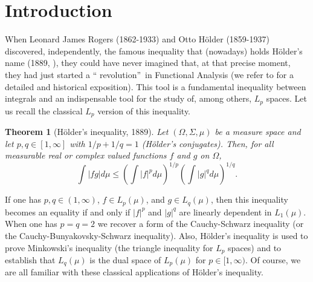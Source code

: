 \documentclass[10pt]{amsart}
\newtheorem{theorem}{Theorem}[section]
\numberwithin{equation}{section}
\begin{document}
\maketitle
\tableofcontents

\section{Introduction}

When Leonard James Rogers (1862-1933) and Otto H{\"{o}}lder (1859-1937)
discovered, independently, the famous inequality that (nowadays) holds H{\"{o}}lder's name (1889, \cite{holder1889}), they could have never imagined
that, at that precise moment, they had just started a \textquotedblleft
revolution\textquotedblright\ in Functional Analysis (we refer to \cite{Maligranda} for a detailed and historical exposition). This tool is a
fundamental inequality between integrals and an indispensable tool for the
study of, among others, $L_{p}$ spaces. Let us recall the classical $L_{p}$
version of this inequality.

\begin{theorem}[H{\"o}lder's inequality, 1889]
Let $(\Omega, \Sigma, \mu)$ be a measure space and let $p, q \in [1, \infty]$
with $1/p + 1/q = 1$ (H{\"o}lder's conjugates). Then, for all measurable
real or complex valued functions $f$ and $g$ on $\Omega$,
\begin{equation*}
\int |f g| d \mu \le \left( \int |f|^p d \mu \right)^{1/p} \left( \int |g|^q
d \mu \right)^{1/q}.
\end{equation*}
\end{theorem}

If one has $p,q\in (1,\infty )$, $f\in L_{p}(\mu )$, and $g\in L_{q}(\mu )$,
then this inequality becomes an equality if and only if $|f|^{p}$ and $|g|^{q}$ are linearly dependent in $L_{1}(\mu )$. When one has $p=q=2$ we
recover a form of the Cauchy-Schwarz inequality (or the
Cauchy-Bunyakovsky-Schwarz inequality). Also, H{\"{o}}lder's inequality is
used to prove Minkowski's inequality (the triangle inequality for $L_{p}$
spaces) and to establish that $L_{q}(\mu )$ is the dual space of $L_{p}(\mu
) $ for $p\in \lbrack 1,\infty )$. Of course, we are all familiar with these
classical applications of H{\"{o}}lder's inequality.
\end{document}

